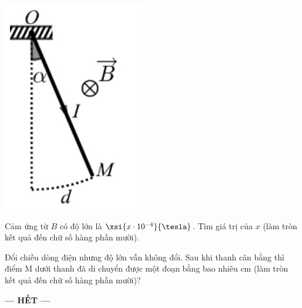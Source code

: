 {\vspace{-0.25cm}\includegraphics[scale=0.6]{../figs/FINAL-SEM1-004-11}}
\begin{ex}
	Cảm ứng từ $B$ có độ lớn là $\xsi{x \cdot 10^{-4}}{\tesla}$. Tìm giá trị của $x$ (làm tròn kết quả đến chữ số hàng phần mười).
\end{ex}
\begin{ex}
	Đổi chiều dòng điện nhưng độ lớn vẫn không đổi. Sau khi thanh cân bằng thì điểm M dưới thanh đã di chuyển được một đoạn bằng bao nhiêu \si{\centi\meter} (làm tròn kết quả đến chữ số hàng phần mười)?
\end{ex}
\begin{center}
	\textbf{--- HẾT ---}
\end{center}
